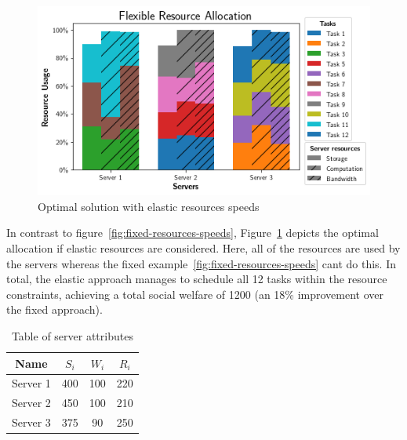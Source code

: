 \begin{figure}[th]
    \centering
    \includegraphics[width=\linewidth]{figs/allocation/flexible_resource_allocation.png}
    \caption{Optimal solution with elastic resources speeds}
    \label{fig:flexible-resources-speeds}
\end{figure}

In contrast to figure~\ref{fig:fixed-resources-speeds}, Figure~\ref{fig:flexible-resources-speeds} depicts the optimal
allocation if elastic resources are considered. Here, all of the resources are used by the servers whereas the fixed
example~\ref{fig:fixed-resources-speeds} cant do this. In total, the elastic approach manages to schedule all 12 tasks
within the resource constraints, achieving a total social welfare of 1200 (an 18\% improvement over the fixed approach).

\begin{table}[h]
    \begin{tabular}{|c|c|c|c|}
        \hline
        Name & $S_i$ & $W_i$ & $R_i$ \\ [0.5ex] \hline
        Server 1 & 400 & 100 & 220 \\ \hline
        Server 2 & 450 & 100 & 210 \\ \hline
        Server 3 & 375 & 90 & 250 \\ \hline
    \end{tabular}
    \caption{Table of server attributes}
    \label{tab:example-servers-properties}
\end{table}

